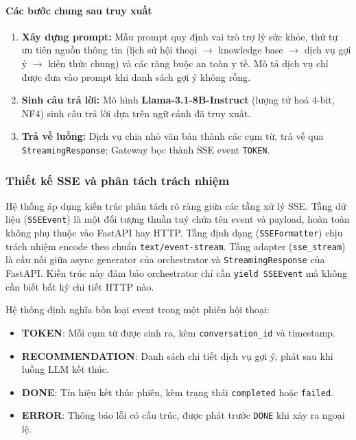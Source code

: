 \paragraph{Các bước chung sau truy xuất}

\begin{enumerate}
    \item \textbf{Xây dựng prompt:} Mẫu prompt quy định vai trò trợ lý sức khỏe, thứ tự ưu tiên nguồn thông tin (lịch sử hội thoại $\rightarrow$ knowledge base $\rightarrow$ dịch vụ gợi ý $\rightarrow$ kiến thức chung) và các ràng buộc an toàn y tế. Mô tả dịch vụ chỉ được đưa vào prompt khi danh sách gợi ý không rỗng.

    \item \textbf{Sinh câu trả lời:} Mô hình \textbf{Llama-3.1-8B-Instruct} (lượng tử hoá 4-bit, NF4) sinh câu trả lời dựa trên ngữ cảnh đã truy xuất.

    \item \textbf{Trả về luồng:} Dịch vụ chia nhỏ văn bản thành các cụm từ, trả về qua \texttt{StreamingResponse}; Gateway bọc thành SSE event \texttt{TOKEN}.
\end{enumerate}

\subsubsection{Thiết kế SSE và phân tách trách nhiệm}

Hệ thống áp dụng kiến trúc phân tách rõ ràng giữa các tầng xử lý SSE. Tầng dữ liệu (\texttt{SSEEvent}) là một đối tượng thuần tuý chứa tên event và payload, hoàn toàn không phụ thuộc vào FastAPI hay HTTP. Tầng định dạng (\texttt{SSEFormatter}) chịu trách nhiệm encode theo chuẩn \texttt{text/event-stream}. Tầng adapter (\texttt{sse\_stream}) là cầu nối giữa async generator của orchestrator và \texttt{StreamingResponse} của FastAPI. Kiến trúc này đảm bảo orchestrator chỉ cần \texttt{yield SSEEvent} mà không cần biết bất kỳ chi tiết HTTP nào.

Hệ thống định nghĩa bốn loại event trong một phiên hội thoại:

\begin{itemize}
    \item \textbf{TOKEN}: Mỗi cụm từ được sinh ra, kèm \texttt{conversation\_id} và timestamp.
    \item \textbf{RECOMMENDATION}: Danh sách chi tiết dịch vụ gợi ý, phát sau khi luồng LLM kết thúc.
    \item \textbf{DONE}: Tín hiệu kết thúc phiên, kèm trạng thái \texttt{completed} hoặc \texttt{failed}.
    \item \textbf{ERROR}: Thông báo lỗi có cấu trúc, được phát trước \texttt{DONE} khi xảy ra ngoại lệ.
\end{itemize}

